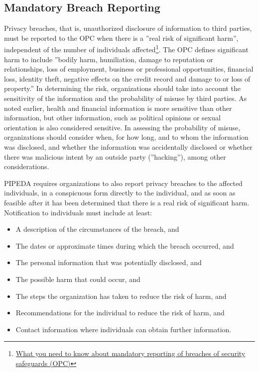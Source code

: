 \subsection*{Mandatory Breach Reporting}

Privacy breaches, that is, unauthorized disclosure of information to third parties, must be reported to the OPC when there is a ''real risk of significant harm'', independent of the number of individuals affected\footnote{\href{https://www.priv.gc.ca/en/privacy-topics/business-privacy/safeguards-and-breaches/privacy-breaches/respond-to-a-privacy-breach-at-your-business/gd_pb_201810/}{What you need to know about mandatory reporting of breaches of security safeguards (OPC)}}. The OPC defines significant harm to include ''bodily harm, humiliation, damage to reputation or relationships, loss of employment, business or professional opportunities, financial loss, identity theft, negative effects on the credit record and damage to or loss of property.'' In determining the risk, organizations should take into account the sensitivity of the information and the probability of misuse by third parties. As noted earlier, health and financial information is more sensitive than other information, but other information, such as political opinions or sexual orientation is also considered sensitive. In assessing the probability of misuse, organizations should consider when, for how long, and to whom the information was disclosed, and whether the information was accidentally disclosed or whether there was malicious intent by an outside party (''hacking''), among other considerations.

PIPEDA requires organizations to also report privacy breaches to the affected individuals, in a conspicuous form directly to the individual, and as soon as feasible after it has been determined that there is a real risk of significant harm. Notification to individuals must include at least:
\begin{itemize}
\item A description of the circumstances of the breach, and
\item The dates or approximate times during which the breach occurred, and
\item The personal information that was potentially disclosed, and
\item The possible harm that could occur, and
\item The steps the organization has taken to reduce the risk of harm, and
\item Recommendations for the individual to reduce the risk of harm, and
\item Contact information where individuals can obtain further information.
\end{itemize}

